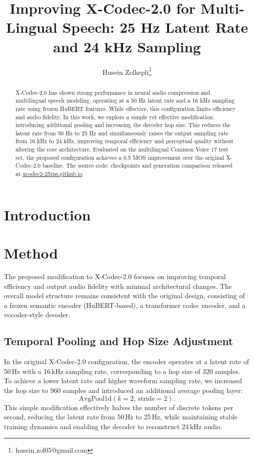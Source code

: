 \documentclass[preprint]{article}
\title{Improving X-Codec-2.0 for Multi-Lingual Speech: 25 Hz Latent Rate and 24 kHz Sampling}
\author{
  Husein Zolkepli\thanks{husein.zol05@gmail.com}
}
\begin{document}
\maketitle

\begin{abstract}

X-Codec-2.0 has shown strong performance in neural audio compression and multilingual speech modeling, operating at a 50 Hz latent rate and a 16 kHz sampling rate using frozen HuBERT features. While effective, this configuration limits efficiency and audio fidelity.
In this work, we explore a simple yet effective modification: introducing additional pooling and increasing the decoder hop size. This reduces the latent rate from 50 Hz to 25 Hz and simultaneously raises the output sampling rate from 16 kHz to 24 kHz, improving temporal efficiency and perceptual quality without altering the core architecture.
Evaluated on the multilingual Common Voice 17 test set, the proposed configuration achieves a 0.5 MOS improvement over the original X-Codec-2.0 baseline. The source code, checkpoints and generation comparison released at \href{https://xcodec2-25tps.github.io}{xcodec2-25tps.github.io}.

\end{abstract}

\section{Introduction}



\section{Method}

The proposed modification to X-Codec-2.0 focuses on improving temporal efficiency and output audio fidelity with minimal architectural changes. The overall model structure remains consistent with the original design, consisting of a frozen semantic encoder (HuBERT-based), a transformer codec encoder, and a vocoder-style decoder.

\subsection{Temporal Pooling and Hop Size Adjustment}
In the original X-Codec-2.0 configuration, the encoder operates at a latent rate of 50\,Hz with a 16\,kHz sampling rate, corresponding to a hop size of 320 samples. To achieve a lower latent rate and higher waveform sampling rate, we increased the hop size to 960 samples and introduced an additional average pooling layer:
\[
\text{AvgPool1d}(k=2,\, \text{stride}=2).
\]
This simple modification effectively halves the number of discrete tokens per second, reducing the latent rate from 50\,Hz to 25\,Hz, while maintaining stable training dynamics and enabling the decoder to reconstruct 24\,kHz audio.
\end{document}
